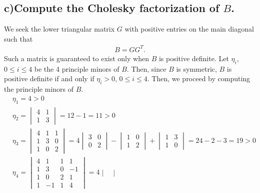 \documentclass[11pt, letterpaper]{article}
\begin{document}
\subsection*{c)\normalfont Compute the Cholesky factorization of $B$.}
    We seek the lower triangular matrix $G$ with positive entries on the main diagonal such that
    \begin{align*}
        B=GG^T.
    \end{align*}
    Such a matrix is guaranteed to exist only when $B$ is positive definite. Let $\eta_i$, $0\leq i\leq 4$
    be the 4 principle minors of $B$. Then, since $B$ is symmetric, $B$ is positive definite if and only 
    if $\eta_i>0$, $0\leq i\leq 4$. Then, we proceed by computing the principle minors of $B$. 
    \begin{align*}
        &\eta_1=4>0\\
        &\eta_2=
        \begin{vmatrix}
            4 & 1\\
            1 & 3
        \end{vmatrix}
        =12-1=11>0\\
        &\eta_3=
        \begin{vmatrix}
            4 & 1 & 1\\
            1 & 3 & 0\\
            1 & 0 & 2
        \end{vmatrix}
        =4
        \begin{vmatrix}
            3 & 0\\
            0 & 2
        \end{vmatrix}
        -
        \begin{vmatrix}
            1 & 0\\
            1 & 2
        \end{vmatrix}
        +
        \begin{vmatrix}
            1 & 3\\
            1 & 0
        \end{vmatrix}
        =24-2-3=19>0\\
        &\eta_4=
        \begin{vmatrix}
            4 & 1 & 1 & 1\\
            1 & 3 & 0 & -1\\
            1 & 0 & 2 & 1\\
            1 & -1 & 1 & 4    
        \end{vmatrix}
        =4
        \begin{vmatrix}

\end{vmatrix}
\end{align*}
\end{document}
